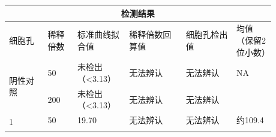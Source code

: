 \documentclass[UTF8,10pt,a4paper,fontset=fandol]{ctexart}
\newcommand{\fieldvalue}[1]{#1}
\newcommand{\handwritten}[1]{#1}
\begin{document}
\medskip

\begin{tabular}{|p{0.13\linewidth}|p{0.10\linewidth}|p{0.16\linewidth}|p{0.19\linewidth}|p{0.17\linewidth}|p{0.13\linewidth}|}
\hline
\multicolumn{6}{|c|}{检测结果}\\ \hline
细胞孔 & 稀释倍数 & 标准曲线拟合值 & 稀释倍数回算值 & 细胞孔检出值 & 均值（保留2位小数）
\\ \hline
\multirow{2}{*}{阴性对照} &
\fieldvalue{\handwritten{50}} &
\fieldvalue{\handwritten{未检出（<3.13）}} &
\fieldvalue{\handwritten{无法辨认}} &
\fieldvalue{\handwritten{无法辨认}} &
NA
\\ \cline{2-6}
&
\fieldvalue{\handwritten{200}} &
\fieldvalue{\handwritten{未检出（<3.13）}} &
\fieldvalue{\handwritten{无法辨认}} &
\fieldvalue{\handwritten{无法辨认}} &
\\ \hline
\multirow{2}{*}{1} &
\fieldvalue{\handwritten{50}} &
\fieldvalue{\handwritten{19.70}} &
\fieldvalue{\handwritten{无法辨认}} &
\fieldvalue{\handwritten{无法辨认}} &
\fieldvalue{\handwritten{约109.4}}
\\ \cline{2-6}
&

\end{tabular}
\end{document}
